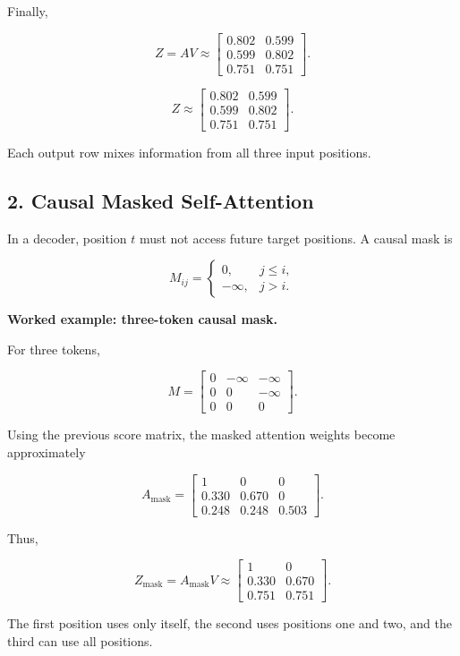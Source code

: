 \documentclass[11pt,a4paper,twoside]{article}
\begin{document}
Finally,

\[
Z=AV
\approx
\begin{bmatrix}
0.802&0.599\\
0.599&0.802\\
0.751&0.751
\end{bmatrix}.
\]

\[
\boxed{
Z\approx
\begin{bmatrix}
0.802&0.599\\
0.599&0.802\\
0.751&0.751
\end{bmatrix}.}
\]

Each output row mixes information from all three input positions.

\subsection*{2. Causal Masked Self-Attention}

In a decoder, position $t$ must not access future target positions. A causal mask is

\[
M_{ij}=
\begin{cases}
0,&j\leq i,\\
-\infty,&j>i.
\end{cases}
\]

\textbf{Worked example: three-token causal mask.}

For three tokens,

\[
M=
\begin{bmatrix}
0&-\infty&-\infty\\
0&0&-\infty\\
0&0&0
\end{bmatrix}.
\]

Using the previous score matrix, the masked attention weights become approximately

\[
A_{\mathrm{mask}}=
\begin{bmatrix}
1&0&0\\
0.330&0.670&0\\
0.248&0.248&0.503
\end{bmatrix}.
\]

Thus,

\[
Z_{\mathrm{mask}}
=A_{\mathrm{mask}}V
\approx
\begin{bmatrix}
1&0\\
0.330&0.670\\
0.751&0.751
\end{bmatrix}.
\]

The first position uses only itself, the second uses positions one and two, and the third can use all positions.
\end{document}
